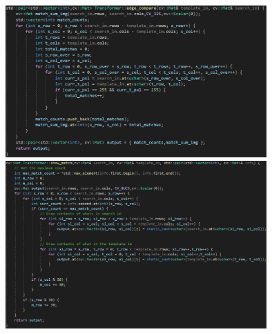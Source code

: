 \documentclass[12p,letterpaper]{article}
\begin{document}
			\begin{figure}[h]
				\hspace*{-0.8in}
				\begin{minipage}{0.63\textwidth}
					\includegraphics[width=10cm]{images/prob2_slidingwindow.PNG}
				\end{minipage}
				\begin{minipage}{0.63\textwidth}
					\includegraphics[width=10cm]{images/prob2_showimg.PNG}
				\end{minipage}
			\end{figure}
				
\end{document}

